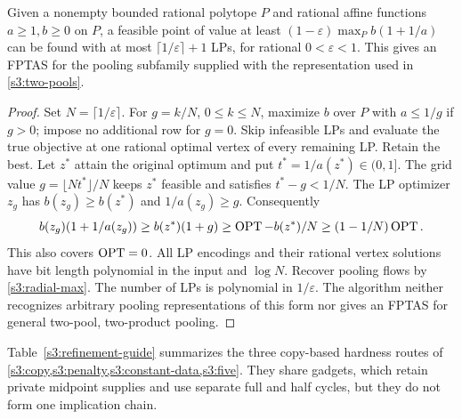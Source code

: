 \begin{proposition}\label{s3:fptas}
Given a nonempty bounded rational polytope $P$ and rational affine
functions $a\ge1,b\ge0$ on $P$, a feasible point of value at least
$(1-\varepsilon)\max_P b(1+1/a)$ can be found with at most
$\lceil1/\varepsilon\rceil+1$ LPs, for rational $0<\varepsilon<1$.
This gives an FPTAS for the pooling subfamily supplied with the
representation used in \cref{s3:two-pools}.
\end{proposition}
\begin{proof}
Set $N=\lceil1/\varepsilon\rceil$. For $g=k/N$, $0\le k\le N$,
maximize $b$ over $P$ with $a\le1/g$ if $g>0$; impose no additional
row for $g=0$. Skip infeasible LPs and evaluate the true objective at
one rational optimal vertex of every remaining LP. Retain the best.
Let $z^*$ attain the original optimum and put $t^*=1/a(z^*)\in(0,1]$.
The grid value $g=\lfloor Nt^*\rfloor/N$ keeps $z^*$ feasible and
satisfies $t^*-g<1/N$. The LP optimizer $z_g$ has $b(z_g)\ge b(z^*)$
and $1/a(z_g)\ge g$. Consequently
\[
 b(z_g)(1+1/a(z_g))\ge b(z^*)(1+g)
 \ge\operatorname{OPT}-b(z^*)/N\ge(1-1/N)\operatorname{OPT}.
\]
This also covers $\operatorname{OPT}=0$. All LP encodings and their rational vertex
solutions have bit length polynomial in the input and $\log N$.
Recover pooling flows by \eqref{s3:radial-max}. The number of LPs is
polynomial in $1/\varepsilon$. The algorithm neither recognizes arbitrary
pooling representations of this form nor gives an FPTAS for general
two-pool, two-product pooling.
\end{proof}

Table~\ref{s3:refinement-guide} summarizes the three copy-based hardness
routes of \cref{s3:copy,s3:penalty,s3:constant-data,s3:five}. They share
gadgets, which retain private midpoint supplies and use separate full
and half cycles, but they do not form one implication chain.


